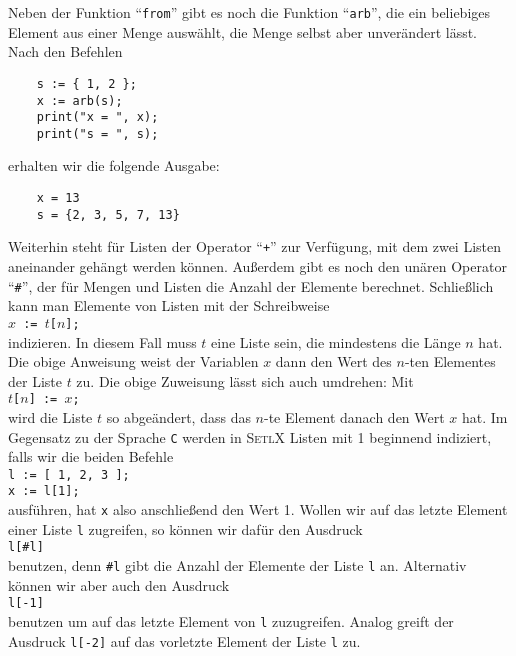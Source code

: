 Neben der Funktion ``\texttt{from}'' gibt es noch die Funktion
``\texttt{arb}'',  die ein beliebiges Element aus einer Menge auswählt, die Menge selbst
aber unverändert lässt.  Nach den Befehlen
\begin{verbatim}
    s := { 1, 2 };
    x := arb(s);
    print("x = ", x);
    print("s = ", s);
\end{verbatim}
erhalten wir die folgende Ausgabe:
\begin{verbatim}
    x = 13
    s = {2, 3, 5, 7, 13}
\end{verbatim}


Weiterhin steht für Listen der Operator ``\texttt{+}''
zur Verfügung, mit dem zwei Listen aneinander gehängt werden können.
Außerdem  gibt es noch den unären Operator ``\texttt{\#}'',
der für Mengen und Listen die Anzahl der Elemente berechnet.
Schließlich kann man Elemente von Listen mit der Schreibweise \\[0.2cm]
\hspace*{1.3cm} \texttt{$x$ := $t$[$n$];} \\[0.2cm]
indizieren.  In diesem Fall muss $t$ eine Liste sein, die mindestens die Länge
$n$ hat.  Die obige Anweisung weist der Variablen $x$ dann den Wert des $n$-ten
Elementes der Liste $t$ zu.  Die obige Zuweisung lässt sich auch umdrehen: Mit \\[0.2cm]
\hspace*{1.3cm} \texttt{$t$[$n$] := $x$;} \\[0.2cm]
wird die Liste $t$ so abgeändert, dass das $n$-te Element danach den Wert $x$ hat.
Im Gegensatz zu der Sprache \texttt{C} werden in \textsc{SetlX} Listen mit 1 beginnend
indiziert, falls wir die beiden Befehle
\\[0.2cm]
\hspace*{1.3cm} \texttt{l := [ 1, 2, 3 ];} \\
\hspace*{1.3cm} \texttt{x := l[1];}
\\[0.2cm]
ausführen, hat \texttt{x} also anschließend den Wert 1.  Wollen wir auf das letzte Element einer
Liste \texttt{l} zugreifen, so können wir dafür den Ausdruck
\\[0.2cm]
\hspace*{1.3cm}
\texttt{l[\#l]}
\\[0.2cm]
benutzen, denn \texttt{\#l} gibt die Anzahl der Elemente der Liste \texttt{l} an.  Alternativ können
wir aber auch den Ausdruck
\\[0.2cm]
\hspace*{1.3cm}
\texttt{l[-1]}
\\[0.2cm]
benutzen um auf das letzte Element von \texttt{l} zuzugreifen.  Analog greift der Ausdruck
\texttt{l[-2]} auf das vorletzte Element der Liste \texttt{l} zu.

